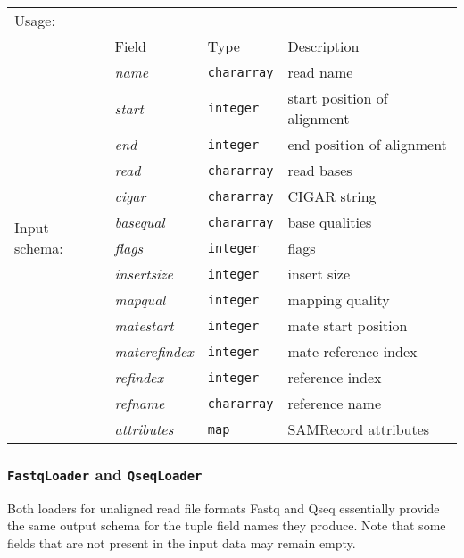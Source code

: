 \begin{tabular}{lp{}p{}p{}}
Usage: & \multicolumn{3}{l}{}
\hspace*{-0.55cm}\begin{minipage}{0.8\textwidth}
  \begin{lstlisting}
  store reads into 'output.bam' using BamStorer('input.bam.asciiheader');
  \end{lstlisting}
  \end{minipage}\hfill\kern-\arrayrulewidth
 \\[0.25cm]
\multirow{15}{*}{Input schema:} & Field & Type & Description\\[0.1cm]
& \emph{name} & \texttt{chararray} & read name\\
& \emph{start} & \texttt{integer} & start position of alignment\\
& \emph{end} & \texttt{integer} & end position of alignment\\
& \emph{read} & \texttt{chararray} & read bases\\
& \emph{cigar} & \texttt{chararray} & CIGAR string\\
& \emph{basequal} & \texttt{chararray} & base qualities\\
& \emph{flags} & \texttt{integer} & flags\\
& \emph{insertsize} & \texttt{integer} & insert size\\
& \emph{mapqual} & \texttt{integer} & mapping quality\\
& \emph{matestart} & \texttt{integer} & mate start position\\
& \emph{materefindex} & \texttt{integer} & mate reference index\\
& \emph{refindex} & \texttt{integer} & reference index\\
& \emph{refname}  & \texttt{chararray} & reference name\\
& \emph{attributes} & \texttt{map} & SAMRecord attributes
\end{tabular}

\subsubsection{\texttt{FastqLoader} and \texttt{QseqLoader}}

Both loaders for unaligned read file formats Fastq and Qseq
essentially provide the same output schema for the tuple field names
they produce.  Note that some fields that are not present in the input
data may remain empty.


